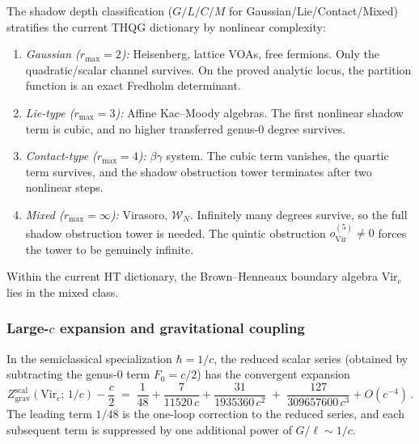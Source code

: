 \begin{remark}
\label{rem:thqg-I-depth-complexity}
The shadow depth classification ($G/L/C/M$ for Gaussian/Lie/Contact/Mixed) stratifies the current THQG dictionary by nonlinear complexity:
\begin{enumerate}[label=\textup{(\alph*)}]
\item \emph{Gaussian ($r_{\max} = 2$):} Heisenberg, lattice VOAs, free fermions. Only the quadratic/scalar channel survives. On the proved analytic locus, the partition function is an exact Fredholm determinant.
\item \emph{Lie-type ($r_{\max} = 3$):} Affine Kac--Moody algebras. The first nonlinear shadow term is cubic, and no higher transferred genus-$0$ degree survives.
\item \emph{Contact-type ($r_{\max} = 4$):} $\beta\gamma$ system. The cubic term vanishes, the quartic term survives, and the shadow obstruction tower terminates after two nonlinear steps.
\item \emph{Mixed ($r_{\max} = \infty$):} Virasoro, $\mathcal{W}_N$. Infinitely many degrees survive, so the full shadow obstruction tower is needed. The quintic obstruction $o^{(5)}_{\mathrm{Vir}} \neq 0$ forces the tower to be genuinely infinite.
\end{enumerate}
Within the current HT dictionary, the Brown--Henneaux boundary algebra $\mathrm{Vir}_c$ lies in the mixed class.
\end{remark}

\subsubsection{Large-$c$ expansion and gravitational coupling}

\begin{proposition}
\label{prop:thqg-I-1c-expansion}
In the semiclassical specialization $\hbar = 1/c$, the reduced scalar
series \textup{(}obtained by subtracting the genus-$0$ term
$F_0=c/2$\textup{)} has the convergent expansion
\begin{equation}\label{eq:thqg-I-1c-expansion}
Z_{\mathrm{grav}}^{\mathrm{scal}}(\mathrm{Vir}_c;\,1/c) - \frac{c}{2}
\;=\;
\frac{1}{48} + \frac{7}{11520\,c} + \frac{31}{1935360\,c^2}
\;+\; \frac{127}{309657600\,c^3} + O(c^{-4})\,.
\end{equation}
The leading term $1/48$ is the one-loop correction to the reduced
series, and each subsequent term is suppressed by one additional power
of $G/\ell \sim 1/c$.
\end{proposition}

